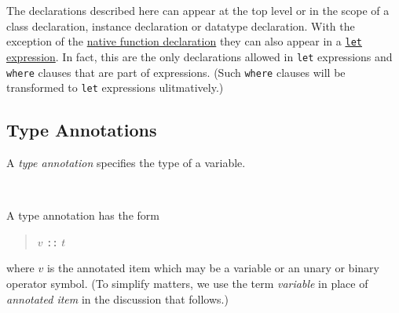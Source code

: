 The declarations described here can appear at the top level or in the scope of a class  declaration, instance declaration or datatype declaration. With the exception of the \hyperref[nativefun]{native function declaration} they can also appear in a \hyperref[letexpr]{\texttt{let} expression}. In fact, this are the only declarations allowed in \texttt{let} expressions and \texttt{where} clauses that are part of expressions. (Such \texttt{where} clauses will be transformed to \texttt{let} expressions ulitmatively.)

\begin{flushleft}
  
  \alt {}        
  \alt {}      
\end{flushleft}

\subsection{Type Annotations} \label{annotation}

A \emph{type annotation} specifies the type of a variable.

\begin{flushleft}
  \sym{::} \\
  \oder{}  \oder{} 
\end{flushleft}


A type annotation has the form
\begin{quote}
$v$ \texttt{::} $t$
\end{quote}
where $v$ is the annotated item which may be a variable or an unary or binary operator symbol. (To simplify matters, we use the term \emph{variable} in place of \emph{annotated item} in the discussion that follows.)

